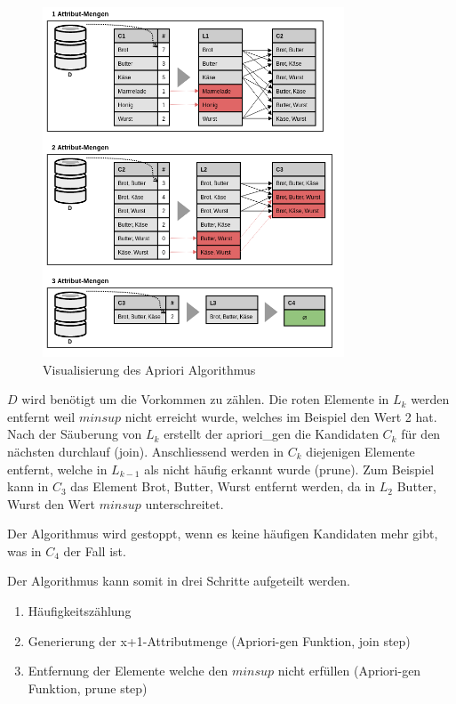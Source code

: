 \begin{figure}[H]
\RawFloats
\centering
\includegraphics[width=0.8\textwidth]{images/Apriori-Algorithmus.png}
\caption{Visualisierung des Apriori Algorithmus}
\label{fig:recherche:vorgehensweise:apriorialgorithmus}
\end{figure}

$D$ wird benötigt um die Vorkommen zu zählen. Die roten Elemente in $L_k$ werden entfernt weil $minsup$ nicht erreicht wurde, welches im Beispiel den Wert 2 hat. Nach der Säuberung von $L_k$ erstellt der apriori\_gen die Kandidaten $C_k$ für den nächsten durchlauf (join). Anschliessend werden in $C_k$ diejenigen Elemente entfernt, welche in $L_{k-1}$ als nicht häufig erkannt wurde (prune). Zum Beispiel kann in $C_3$ das Element {Brot, Butter, Wurst} entfernt werden, da in $L_2$ {Butter, Wurst} den Wert $minsup$ unterschreitet.

Der Algorithmus wird gestoppt, wenn es keine häufigen Kandidaten mehr gibt, was in $C_4$ der Fall ist.

Der Algorithmus kann somit in drei Schritte aufgeteilt werden.
\begin{enumerate}
\item Häufigkeitszählung
\item Generierung der x+1-Attributmenge (Apriori-gen Funktion, join step)
\item Entfernung der Elemente welche den $minsup$ nicht erfüllen (Apriori-gen Funktion, prune step)
\end{enumerate}

